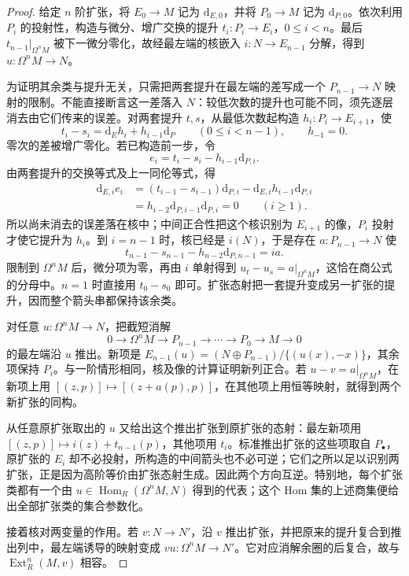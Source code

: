 \begin{proof}
	给定 \(n\) 阶扩张，将 \(E_0\to M\) 记为 \(\mathrm{d}_{E,0}\)，并将 \(P_0\to M\) 记为 \(\mathrm{d}_{P,0}\)。依次利用 \(P_i\) 的投射性，构造与微分、增广交换的提升 \(t_i:P_i\to E_i\)，\(0\le i<n\)。最后 \(t_{n-1}|_{\Omega^nM}\) 被下一微分零化，故经最左端的核嵌入 \(i:N\to E_{n-1}\) 分解，得到 \(u:\Omega^nM\to N\)。

	为证明其余类与提升无关，只需把两套提升在最左端的差写成一个 \(P_{n-1}\to N\) 映射的限制。不能直接断言这一差落入 \(N\)：较低次数的提升也可能不同，须先逐层消去由它们传来的误差。对两套提升 \(t,s\)，从最低次数起构造 \(h_i:P_i\to E_{i+1}\)，使
	\[
		t_i-s_i=\mathrm{d}_Eh_i+h_{i-1}\mathrm{d}_P\qquad(0\le i<n-1),\qquad h_{-1}=0.
	\]
	零次的差被增广零化。若已构造前一步，令
	\[
		e_i=t_i-s_i-h_{i-1}\mathrm{d}_{P,i}.
	\]
	由两套提升的交换等式及上一同伦等式，得
	\[
		\begin{aligned}
			\mathrm{d}_{E,i}e_i &=(t_{i-1}-s_{i-1})\mathrm{d}_{P,i} -\mathrm{d}_{E,i}h_{i-1}\mathrm{d}_{P,i}\\
			&=h_{i-2}\mathrm{d}_{P,i-1}\mathrm{d}_{P,i}=0 \qquad(i\ge1).
		\end{aligned}
	\]
	所以尚未消去的误差落在核中；中间正合性把这个核识别为 \(E_{i+1}\) 的像，\(P_i\) 投射才使它提升为 \(h_i\)。到 \(i=n-1\) 时，核已经是 \(i(N)\)，于是存在 \(a:P_{n-1}\to N\) 使
	\[
		t_{n-1}-s_{n-1}-h_{n-2}\mathrm{d}_{P,n-1}=ia.
	\]
	限制到 \(\Omega^nM\) 后，微分项为零，再由 \(i\) 单射得到 \(u_t-u_s=a|_{\Omega^nM}\)，这恰在商公式的分母中。\(n=1\) 时直接用 \(t_0-s_0\) 即可。扩张态射把一套提升变成另一扩张的提升，因而整个箭头串都保持该余类。

	对任意 \(u:\Omega^nM\to N\)，把截短消解
	\[
		0\longrightarrow\Omega^nM\longrightarrow P_{n-1}\longrightarrow\cdots \longrightarrow P_0\longrightarrow M\longrightarrow0
	\]
	的最左端沿 \(u\) 推出。新项是 \(E_{n-1}(u)=(N\oplus P_{n-1})/\{(u(x),-x)\}\)，其余项保持 \(P_i\)。与一阶情形相同，核及像的计算证明新列正合。若 \(u-v=a|_{\Omega^nM}\)，在新项上用 \([(z,p)]\mapsto[(z+a(p),p)]\)，在其他项上用恒等映射，就得到两个新扩张的同构。

	从任意原扩张取出的 \(u\) 又给出这个推出扩张到原扩张的态射：最左新项用 \([(z,p)]\mapsto i(z)+t_{n-1}(p)\)，其他项用 \(t_i\)。标准推出扩张的这些项取自 \(P_\bullet\)，原扩张的 \(E_i\) 却不必投射，所构造的中间箭头也不必可逆；它们之所以足以识别两扩张，正是因为高阶等价由扩张态射生成。因此两个方向互逆。特别地，每个扩张类都有一个由 \(u\in\operatorname{Hom}_R(\Omega^nM,N)\) 得到的代表；这个 Hom 集的上述商集便给出全部扩张类的集合参数化。

	接着核对两变量的作用。若 \(v:N\to N'\)，沿 \(v\) 推出扩张，并把原来的提升复合到推出列中，最左端诱导的映射变成 \(vu:\Omega^nM\to N'\)。它对应消解余圈的后复合，故与 \(\operatorname{Ext}_R^n(M,v)\) 相容。


\end{proof}
